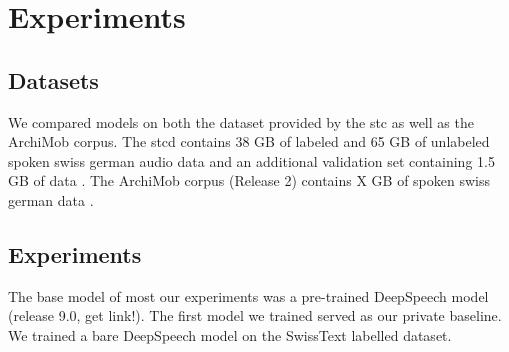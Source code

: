 \section{Experiments}

\subsection{Datasets}
We compared models on both the dataset provided by the \gls{stc} as well as the ArchiMob corpus. The \gls{stcd} contains 38 GB of labeled and 65 GB of unlabeled spoken swiss german audio data and an additional validation set
containing 1.5 GB of data \cite{stc2019}. The ArchiMob corpus (Release 2) contains X GB of spoken swiss german data \cite{archimob2016}.
\subsection{Experiments}

The base model of most our experiments was a pre-trained DeepSpeech model (release 9.0, get link!). The first model we trained served as our private baseline. We trained a bare DeepSpeech model on the SwissText labelled dataset. 